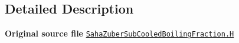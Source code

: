 \subsection{Detailed Description}
{\bfseries Original source file} \href{../../../home/carlo/data/GeN-Foam/GeN-Foam_ffn/GeN-Foam/GeN-Foam/classes/thermalHydraulics/src/physicsModels/heatTransferModels/FSHeatTransferCoefficientModels/subModels/subCooledBoilingFractionModels/SahaZuber/SahaZuberSubCooledBoilingFraction.H}{\tt Saha\+Zuber\+Sub\+Cooled\+Boiling\+Fraction.\+H} 